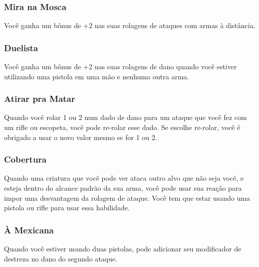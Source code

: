 \documentclass[letterpaper,twocolumn,openany]{dndbook}
\begin{document}
	\subsubsection{Mira na Mosca}
	Você ganha um bônus de +2 nas suas rolagens de ataques com armas à distância.
	
	\subsubsection{Duelista}
	Você ganha um bônus de +2 nas suas rolagens de dano quando você estiver utilizando uma pistola em uma mão e nenhuma outra arma.
	
	\subsubsection{Atirar pra Matar}
	Quando você rolar 1 ou 2 num dado de dano para um ataque que você fez com um rifle ou escopeta, você pode re-rolar esse dado. Se escolhe re-rolar, você é obrigado a usar o novo valor mesmo se for 1 ou 2.
	
	\subsubsection{Cobertura}
	Quando uma criatura que você pode ver ataca outro alvo que não seja você, e esteja dentro do alcance padrão da sua arma, você pode usar sua reação para impor uma desvantagem da rolagem de ataque. Você tem que estar usando uma pistola ou rifle para usar essa habilidade.
	
	\subsubsection{À Mexicana}
	Quando você estiver usando duas pistolas, pode adicionar seu modificador de destreza no dano do segundo ataque.
	
\end{document}
